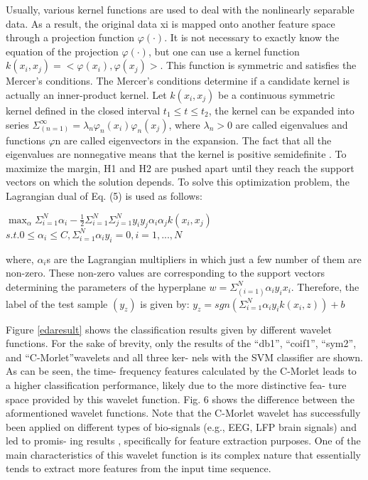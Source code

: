 Usually, various kernel functions are used to deal with the nonlinearly separable data. 
As a result, the original data xi is mapped onto another feature space through a 
projection function ${\varphi(\cdot)}$. It is not necessary to exactly know the equation of the 
projection ${\varphi(\cdot)}$, but one can use a kernel function ${k(x_i,x_j)=<\varphi(x_i),\varphi(x_j)>}$. 
This function is symmetric and satisfies the Mercer’s conditions. The Mercer’s conditions determine 
if a candidate kernel is actually an inner-product kernel. Let ${k(x_i,x_j)}$ be a continuous 
symmetric kernel defined in the closed interval ${t_1\leq t\leq t_2}$, the kernel can be expanded 
into series ${\Sigma_(n=1)^\infty = \lambda_n\varphi_n(x_i)\varphi_n(x_j)}$, where 
${\lambda_n > 0}$ are called eigenvalues and functions $\varphi$n are called eigenvectors in the expansion. 
The fact that all the eigenvalues are nonnegative means that the kernel is positive 
semidefinite \cite{SupportVector1995}. 
To maximize the margin, H1 and H2 are pushed apart until they reach the support vectors 
on which the solution depends. To solve this optimization problem, the Lagrangian dual 
of Eq. (5) is used as follows:

$\max_\alpha \Sigma_{i=1}^{N} \alpha_i - \frac{1}{2} \Sigma_{i=1}^{N} \Sigma_{j=1}^{N} y_i y_j \alpha_i \alpha_j k(x_i, x_j)$\newline
$s.t. 0 \le \alpha_i \le C, \Sigma_{i=1}^{N} \alpha_i y_i = 0, i = 1, ..., N$\newline

where, ${\alpha_i}$s are the Lagrangian multipliers in which just a few number of them are 
non-zero. These non-zero values are corresponding to the support vectors determining 
the parameters of the hyperplane ${w = \Sigma_(i=1)^N\alpha_iy_ix_i }$. Therefore, the label 
of the test sample ${(y_z)}$ is given by:
$y_z = sgn(\Sigma_{i=1}^{N} \alpha_i y_i k(x_i, z)) + b$\newline


Figure \ref{edaresult} shows the classification results given by different wavelet functions. 
For the sake of brevity, only the results of the “db1”, “coif1”, “sym2”, and “C-Morlet”wavelets 
and all three ker- nels with the SVM classifier are shown. As can be seen, the time- frequency 
features calculated by the C-Morlet leads to a higher classification performance, likely due to 
the more distinctive fea- ture space provided by this wavelet function. Fig. 6 shows the 
difference between the aformentioned wavelet functions. Note that the C-Morlet wavelet has 
successfully been applied on different types of bio-signals (e.g., EEG, LFP brain signals) 
and led to promis- ing results , specifically for feature extraction purposes. One of the main 
characteristics of this wavelet function is its complex nature that essentially tends to 
extract more features from the input time sequence.


